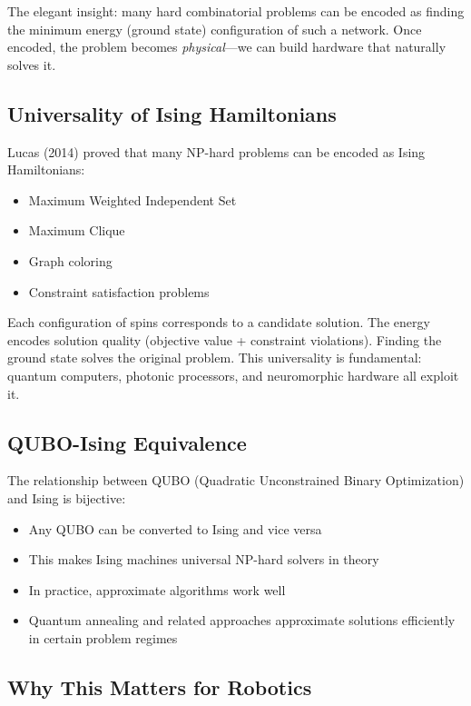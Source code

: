 The elegant insight: many hard combinatorial problems can be encoded as finding the minimum energy (ground state) configuration of such a network. Once encoded, the problem becomes \textit{physical}---we can build hardware that naturally solves it.

\subsection{Universality of Ising Hamiltonians}

Lucas (2014) \cite{Lucas2014} proved that many NP-hard problems can be encoded as Ising Hamiltonians:
\begin{itemize}
\item Maximum Weighted Independent Set \cite{Kochenberger2014}
\item Maximum Clique
\item Graph coloring
\item Constraint satisfaction problems
\end{itemize}

Each configuration of spins corresponds to a candidate solution. The energy encodes solution quality (objective value + constraint violations). Finding the ground state solves the original problem. This universality is fundamental: quantum computers, photonic processors, and neuromorphic hardware all exploit it.

\subsection{QUBO-Ising Equivalence}

The relationship between QUBO (Quadratic Unconstrained Binary Optimization) \cite{Kochenberger2014} and Ising is bijective:
\begin{itemize}
\item Any QUBO can be converted to Ising and vice versa
\item This makes Ising machines universal NP-hard solvers in theory
\item In practice, approximate algorithms work well
\item Quantum annealing and related approaches approximate solutions efficiently in certain problem regimes \cite{Kadowaki2012}
\end{itemize}

\subsection{Why This Matters for Robotics}

